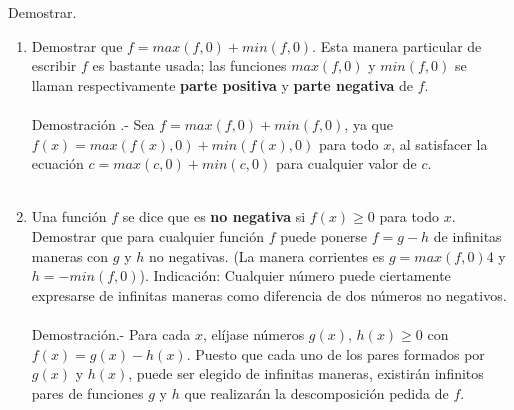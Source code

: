 \begin{teo} Demostrar.
\begin{enumerate}[\bfseries a)]
\item Demostrar que $f=max(f,0)+min(f,0)$. Esta manera particular de escribir $f$ es bastante usada; las funciones $max(f,0)$ y $min(f,0)$ se llaman respectivamente \textbf{parte positiva} y \textbf{parte negativa} de $f$.\\\\
Demostración .- \; Sea $f=max(f,0)+min(f,0)$, ya que $f(x) = max(f(x),0)+ min(f(x),0)$ para todo $x$, al satisfacer la ecuación $c = max(c,0)+ min(c,0)$ para cualquier valor de $c$.\\\\
\item Una función $f$ se dice que es \textbf{no negativa} si $f(x)\geq 0$ para todo $x$. Demostrar que para cualquier función $f$ puede ponerse $f=g-h$ de infinitas maneras con $g$ \; y \; $h$ no negativas. (La manera corrientes es $g=max(f,0)$4 \; y \; $h=-min(f,0)$). Indicación: Cualquier número puede ciertamente expresarse de infinitas maneras como diferencia de dos números no negativos.\\\\
Demostración.- \; Para cada $x$, elíjase números $g(x)$, $h(x) \geq 0$ con $f(x) = g(x) - h(x).$ Puesto que cada uno de los pares formados por $g(x)$ \; y \; $h(x)$, puede ser elegido de infinitas maneras, existirán infinitos pares de funciones $g$ \; y \; $h$ que realizarán la descomposición pedida de $f.$\\\\
\end{enumerate}
\end{teo}

